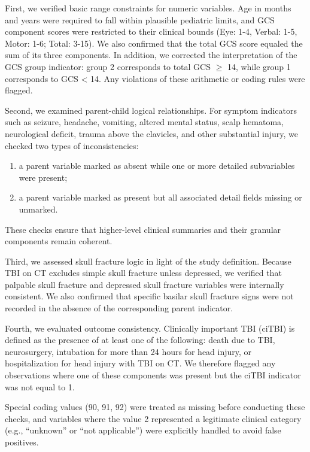 \documentclass[11pt,letterpaper]{article}
\begin{document}
First, we verified basic range constraints for numeric variables. Age in months and years were required to fall within plausible pediatric limits, and GCS component scores were restricted to their clinical bounds (Eye: 1-4, Verbal: 1-5, Motor: 1-6; Total: 3-15). We also confirmed that the total GCS score equaled the sum of its three components. In addition, we corrected the interpretation of the GCS group indicator: group 2 corresponds to total GCS $\geq$ 14, while group 1 corresponds to GCS < 14. Any violations of these arithmetic or coding rules were flagged.

Second, we examined parent-child logical relationships. For symptom indicators such as seizure, headache, vomiting, altered mental status, scalp hematoma, neurological deficit, trauma above the clavicles, and other substantial injury, we checked two types of inconsistencies:
\begin{enumerate}
    \item a parent variable marked as absent while one or more detailed subvariables were present;
    \item a parent variable marked as present but all associated detail fields missing or unmarked.
\end{enumerate}

These checks ensure that higher-level clinical summaries and their granular components remain coherent.

Third, we assessed skull fracture logic in light of the study definition. Because TBI on CT excludes simple skull fracture unless depressed, we verified that palpable skull fracture and depressed skull fracture variables were internally consistent. We also confirmed that specific basilar skull fracture signs were not recorded in the absence of the corresponding parent indicator.

Fourth, we evaluated outcome consistency. Clinically important TBI (ciTBI) is defined as the presence of at least one of the following: death due to TBI, neurosurgery, intubation for more than 24 hours for head injury, or hospitalization for head injury with TBI on CT. We therefore flagged any observations where one of these components was present but the ciTBI indicator was not equal to 1.

Special coding values (90, 91, 92) were treated as missing before conducting these checks, and variables where the value 2 represented a legitimate clinical category (e.g., “unknown” or “not applicable”) were explicitly handled to avoid false positives.
\end{document}
